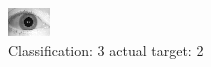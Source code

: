 \begin{figure}[h!]
\begin{center}
\includegraphics[width=0.60\columnwidth]{figures/ID1619_class_3_target_2.png}
\end{center}
\caption{ Classification: 3 actual target: 2}
\label{fig:ID1619_class_3_target_2}
\end{figure}
